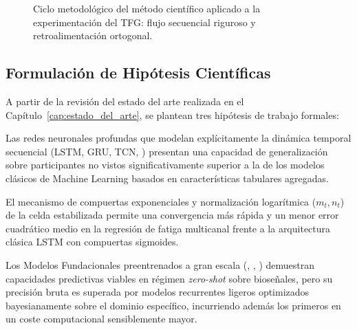 \begin{figure}[htbp]
{%
    }
    \caption{Ciclo metodológico del método científico aplicado a la experimentación del TFG: flujo secuencial riguroso y retroalimentación ortogonal.}
    \label{fig:metodo_cientifico_diagrama}
\end{figure}

\subsection{Formulación de Hipótesis Científicas}

A partir de la revisión del estado del arte realizada en el Capítulo~\ref{cap:estado_del_arte}, se plantean tres hipótesis de trabajo formales:

\begin{hipotesis}
\label{hip:h1}
Las redes neuronales profundas que modelan explícitamente la dinámica temporal secuencial (LSTM, GRU, TCN, \xlstm{}) presentan una capacidad de generalización sobre participantes no vistos significativamente superior a la de los modelos clásicos de Machine Learning basados en características tabulares agregadas.
\end{hipotesis}

\begin{hipotesis}
\label{hip:h2}
El mecanismo de compuertas exponenciales y normalización logarítmica ($m_t, n_t$) de la celda estabilizada \slstm{} permite una convergencia más rápida y un menor error cuadrático medio en la regresión de fatiga multicanal frente a la arquitectura clásica LSTM con compuertas sigmoides.
\end{hipotesis}

\begin{hipotesis}
\label{hip:h3}
Los Modelos Fundacionales preentrenados a gran escala (\chronos{}, \timesfm{}, \moment{}) demuestran capacidades predictivas viables en régimen \textit{zero-shot} sobre bioseñales, pero su precisión bruta es superada por modelos recurrentes ligeros optimizados bayesianamente sobre el dominio específico, incurriendo además los primeros en un coste computacional sensiblemente mayor.
\end{hipotesis}


